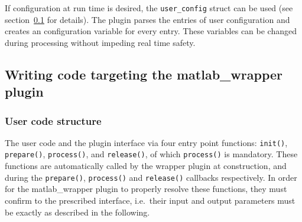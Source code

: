 \documentclass[11pt,a4paper,twoside]{article}
\newcommand{\+}{\discretionary{\mbox{\scriptsize$\hookleftarrow$}}{}{}}
\begin{document}
If configuration at run time is desired, the \texttt{user\_config}
struct can be used (see section~\ref{subsec:writing_code} for details).
The plugin parses the entries of user configuration and creates an
\mha{} configuration variable for every entry. These variables can be
changed during processing without impeding real time safety.

\subsection{Writing code targeting the matlab\_wrapper plugin}\label{subsec:writing_code}
\subsubsection{User code structure}
The user code and the plugin interface via four entry point functions:
\texttt{init()}, \texttt{prepare()}, \texttt{process()}, and \texttt{release()}, of which \texttt{process()} is mandatory.
These functions are automatically called by the wrapper plugin at construction, and during the \texttt{prepare()},
\texttt{process()} and \texttt{release()} callbacks respectively.
In order for the matlab\_wrapper plugin to properly resolve these functions, they must confirm to the prescribed interface,
i.e.\ their input and output parameters must be exactly as described in the following.\\
\end{document}
